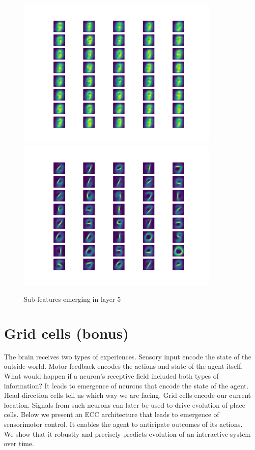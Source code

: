 \documentclass[12pt]{article}
\begin{document}
\begin{figure}[!htbp]
	\centering
	\includegraphics[width=10cm]{predictive_coding_stacked3_experiment2 before}
	\includegraphics[width=10cm]{predictive_coding_stacked3_experiment2 after}
	\caption{Sub-features emerging in layer 5}
	\label{fig:v3 experiment2}
\end{figure} 

\section{Grid cells (bonus)}

The brain receives two types of experiences. Sensory input encode the state of the outside world. Motor feedback encodes the actions and state of the agent itself. What would happen if a neuron's receptive field included both types of information?
It leads to emergence of neurons that encode the state of the agent. Head-direction cells tell us which way we are facing. Grid cells encode our current location. 
Signals from such neurons can later be used to drive evolution of place cells.
Below we present an ECC architecture that leads to emergence of sensorimotor control. It enables the agent to anticipate outcomes of its actions. We show that it 
robustly and precisely predicts evolution of an interactive system over time.
\end{document}
